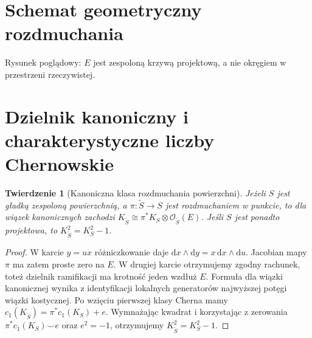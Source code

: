 \documentclass[11pt,a4paper,oneside]{report}
\newcommand{\dd}{\mathrm d}
\theoremstyle{plain}
\newtheorem{twierdzenie}{Twierdzenie}[section]
\theoremstyle{definition}
\theoremstyle{remark}
\begin{document}
\section{Schemat geometryczny rozdmuchania}
\begin{center}
\par\smallskip\small Rysunek poglądowy: $E$ jest zespoloną krzywą projektową,
a nie okręgiem w przestrzeni rzeczywistej.
\end{center}

\section{Dzielnik kanoniczny i charakterystyczne liczby Chernowskie}
\begin{twierdzenie}[Kanoniczna klasa rozdmuchania powierzchni]
\label{thm:xvii-canonical}
Jeżeli $S$ jest gładką zespoloną powierzchnią,
a $\pi:\widetilde S\to S$ jest rozdmuchaniem w punkcie,
to dla wiązek kanonicznych zachodzi
$K_{\widetilde S}\cong\pi^*K_S\otimes\mathcal O_{\widetilde S}(E)$.
Jeśli $S$ jest ponadto projektowa, to
$K_{\widetilde S}^2=K_S^2-1$.
\end{twierdzenie}
\begin{proof}
W karcie $y=ux$ różniczkowanie daje
$\dd x\wedge\dd y=x\,\dd x\wedge\dd u$.
Jacobian mapy $\pi$ ma zatem proste zero na $E$.
W drugiej karcie otrzymujemy zgodny rachunek, toteż
dzielnik ramifikacji ma krotność jeden wzdłuż $E$.
Formuła dla wiązki kanonicznej wynika z identyfikacji
lokalnych generatorów najwyższej potęgi wiązki kostycznej.
Po wzięciu pierwszej klasy Cherna mamy
$c_1(K_{\widetilde S})=\pi^*c_1(K_S)+e$.
Wymnażając kwadrat i korzystając z zerowania
$\pi^*c_1(K_S)\smile e$ oraz $e^2=-1$,
otrzymujemy $K_{\widetilde S}^2=K_S^2-1$.
\end{proof}
\end{document}
